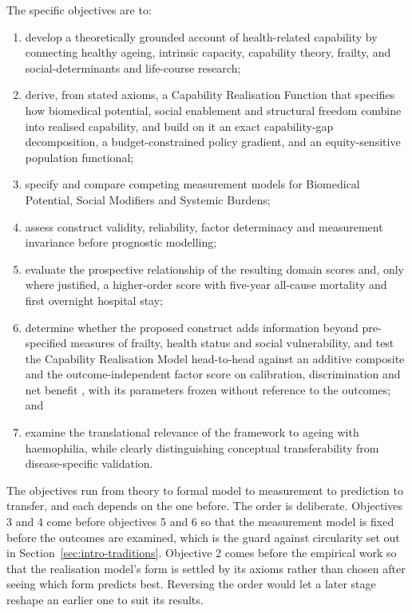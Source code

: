 The specific objectives are to:
\begin{enumerate}
    \item develop a theoretically grounded account of health-related capability by connecting healthy ageing, intrinsic capacity, capability theory, frailty, and social-determinants and life-course research;
    \item derive, from stated axioms, a Capability Realisation Function that specifies how biomedical potential, social enablement and structural freedom combine into realised capability, and build on it an exact capability-gap decomposition, a budget-constrained policy gradient, and an equity-sensitive population functional;
    \item specify and compare competing measurement models for Biomedical Potential, Social Modifiers and Systemic Burdens;
    \item assess construct validity, reliability, factor determinacy and measurement invariance before prognostic modelling;
    \item evaluate the prospective relationship of the resulting domain scores and, only where justified, a higher-order score with five-year all-cause mortality and first overnight hospital stay;
    \item determine whether the proposed construct adds information beyond pre-specified measures of frailty, health status and social vulnerability, and test the Capability Realisation Model head-to-head against an additive composite and the outcome-independent factor score on calibration, discrimination and net benefit \citep{vickers_elkin_2006}, with its parameters frozen without reference to the outcomes; and
    \item examine the translational relevance of the framework to ageing with haemophilia, while clearly distinguishing conceptual transferability from disease-specific validation.
\end{enumerate}

The objectives run from theory to formal model to measurement to prediction to transfer, and each depends on the one before. The order is deliberate. Objectives 3 and 4 come before objectives 5 and 6 so that the measurement model is fixed before the outcomes are examined, which is the guard against circularity set out in Section~\ref{sec:intro-traditions}. Objective 2 comes before the empirical work so that the realisation model's form is settled by its axioms rather than chosen after seeing which form predicts best. Reversing the order would let a later stage reshape an earlier one to suit its results.

